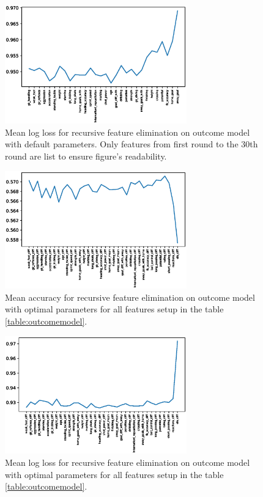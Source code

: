 \begin{figure}[H]
    \centering
    \includegraphics[width=0.7\textwidth]{img/default_avg_lloss.eps}
    \caption{Mean log loss for recursive feature elimination on outcome model with default parameters. Only features from first round to the 30th round are list to ensure figure's readability.}
    \label{fig:def_avg_loss}
\end{figure}

\begin{figure}[H]
    \centering
    \includegraphics[width=0.7\textwidth]{img/optimal_avg_accuracy.eps}
    \caption{Mean accuracy for recursive feature elimination on outcome model with optimal parameters for all features setup in the table \ref{table:outcomemodel}.}
    \label{fig:optimal_avg_accu}
\end{figure}

\begin{figure}[H]
    \centering
    \includegraphics[width=0.7\textwidth]{img/optimal_avg_lloss.eps}
    \caption{Mean log loss for recursive feature elimination on outcome model with optimal parameters for all features setup in the table \ref{table:outcomemodel}.}
    \label{fig:optimal_avg_loss}
\end{figure}

